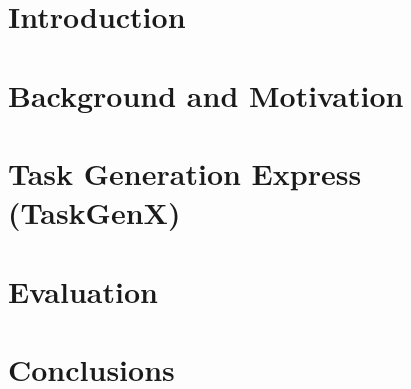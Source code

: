 \section{Introduction}
\label{sec:intro}



\section{Background and Motivation}
\label{sec.taskgenx.background}


\section{Task Generation Express (TaskGenX)}
\label{sec.taskgenx.ram}






\section{Evaluation}
\label{sec.taskgenx.evaluation}


%

\section{Conclusions}
\label{sec.taskgenx.conclusions}


